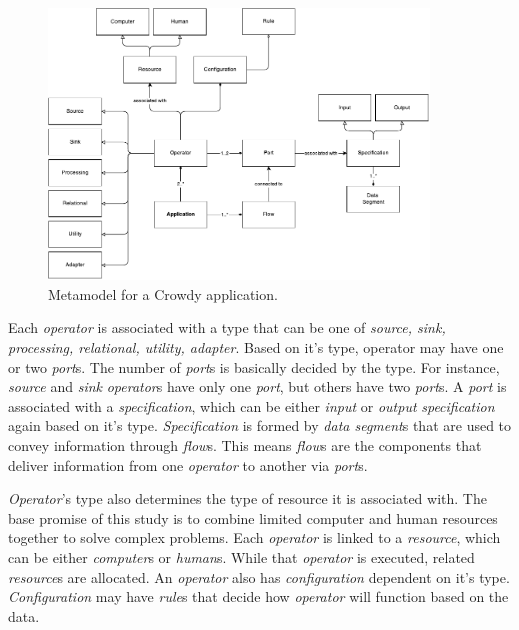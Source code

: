 \begin{figure}[ht]
	\centering
	\includegraphics[width=0.9\textwidth]{figures/ApplicationMetamodel.pdf}
	\caption{Metamodel for a Crowdy application.}
	\label{fig:metamodel}
\end{figure}

Each \textit{operator} is associated with a type that can be one of \textit{source, sink, 
processing, relational, utility, adapter}. Based on it's type, operator may have 
one or two \textit{port}s. The number of \textit{port}s is basically decided by the type. 
For instance, \textit{source} and \textit{sink} \textit{operator}s have only one \textit{port}, 
but others have two \textit{port}s. A \textit{port} is associated with a \textit{specification}, 
which can be either \textit{input} or \textit{output} \textit{specification} again based on 
it's type. \textit{Specification} is formed by \textit{data segment}s that are used to 
convey information through \textit{flow}s. This means \textit{flow}s are the 
components that deliver information from one \textit{operator} to another via \textit{port}s.

\textit{Operator}'s type also determines the type of resource it is associated with. The base 
promise of this study is to combine limited computer and human resources together to 
solve complex problems. Each \textit{operator} is linked to a \textit{resource}, which can be either 
\textit{computer}s or \textit{human}s. While that \textit{operator} is executed, related \textit{resource}s are 
allocated. An \textit{operator} also has \textit{configuration} dependent on it's type. \textit{Configuration} 
may have \textit{rule}s that decide how \textit{operator} will function based on the data.

